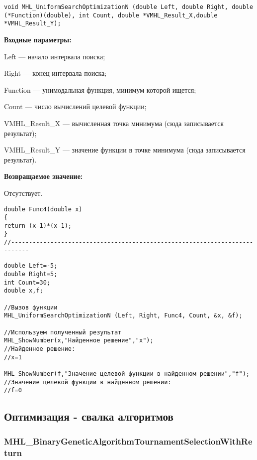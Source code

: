 \documentclass[a4paper,12pt]{article}
\begin{document}
\begin{lstlisting}[label=code_syntax_MHL_UniformSearchOptimizationN,caption=Синтаксис]
void MHL_UniformSearchOptimizationN (double Left, double Right, double (*Function)(double), int Count, double *VMHL_Result_X,double *VMHL_Result_Y);
\end{lstlisting}

\textbf{Входные параметры:}

 Left --- начало интервала поиска;
 
Right --- конец интервала поиска;
 
Function --- унимодальная функция, минимум которой ищется;
 
Count --- число вычислений целевой функции;
 
VMHL\_Result\_X --- вычисленная точка минимума (сюда записывается результат);
 
VMHL\_Result\_Y --- значение функции в точке минимума (сюда записывается результат).

\textbf{Возвращаемое значение:}
 
 Отсутствует.

\begin{lstlisting}[caption=Оптимизируемая функция]
double Func4(double x)
{
return (x-1)*(x-1);
}
//---------------------------------------------------------------------------
\end{lstlisting}


\begin{lstlisting}[label=code_use_MHL_UniformSearchOptimizationN,caption=Пример использования]
double Left=-5;
double Right=5;
int Count=30;
double x,f;

//Вызов функции
MHL_UniformSearchOptimizationN (Left, Right, Func4, Count, &x, &f);

//Используем полученный результат
MHL_ShowNumber(x,"Найденное решение","x");
//Найденное решение:
//x=1

MHL_ShowNumber(f,"Значение целевой функции в найденном решении","f");
//Значение целевой функции в найденном решении:
//f=0
\end{lstlisting}

\subsection{Оптимизация - свалка алгоритмов}

\subsubsection{MHL\_BinaryGeneticAlgorithmTournamentSelectionWithReturn}\label{MHL_BinaryGeneticAlgorithmTournamentSelectionWithReturn}
\end{document}
